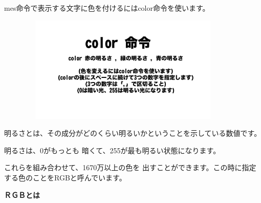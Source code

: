 \documentclass[a4paper,dvipdfmx]{jarticle}
\begin{document}
mes命令で表示する文字に色を付けるにはcolor命令を使います。



\begin{center}
\includegraphics[width=12.277cm,height=5.08cm]{text02-img/text02-img030.png}

\end{center}

\bigskip


\bigskip


\bigskip


\bigskip


\bigskip


\bigskip


\bigskip


\bigskip


\bigskip


\bigskip


\bigskip


\bigskip


\bigskip

明るさとは、その成分がどのくらい明るいかということを示している数値です。

明るさは、0がもっとも
暗くて、255が最も明るい状態になります。

これらを組み合わせて、1670万以上の色を
出すことができます。この時に指定する色のことをRGBと呼んでいます。


\bigskip

{\bfseries
ＲＧＢとは}


\bigskip
\end{document}
